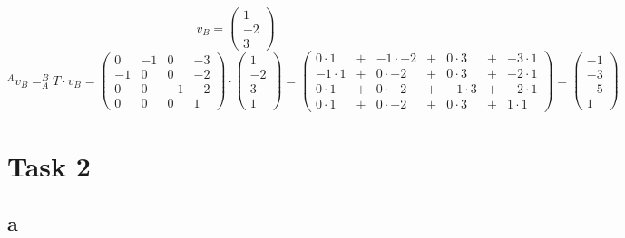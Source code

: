 \begin{equation}
  v_{B}
  =
  \begin{pmatrix}
    1 \\
    -2\\
    3
  \end{pmatrix}
\end{equation}
\begin{equation}
  ^{A}v_{B}
  =
  ^{B}_{A}T\cdot v_{B}
  =
  \begin{pmatrix}
    0   & -1  & 0   & -3  \\
    -1  & 0   & 0   & -2  \\
    0   & 0   & -1  & -2  \\
    0   & 0   & 0   & 1
  \end{pmatrix}
  \cdot
  \begin{pmatrix}
    1 \\
    -2\\
    3 \\
    1
  \end{pmatrix}
  =
  \begin{pmatrix}
    0\cdot 1  &+& -1\cdot -2 &+& 0\cdot 3  &+& -3\cdot 1 \\
    -1\cdot 1 &+& 0\cdot -2  &+& 0\cdot 3  &+& -2\cdot 1 \\
    0\cdot 1  &+& 0\cdot -2  &+& -1\cdot 3 &+& -2\cdot 1 \\
    0\cdot 1  &+& 0\cdot -2  &+& 0\cdot 3  &+& 1\cdot 1
  \end{pmatrix}
  =
  \begin{pmatrix}
    -1 \\
    -3\\
    -5 \\
    1
  \end{pmatrix}
\end{equation}


\section{Task 2}\label{ass3_t2}

\subsection{a}\label{ass3_t2_a}

